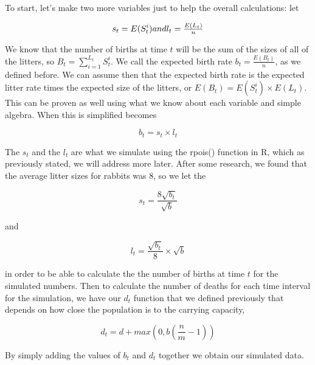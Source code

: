 \documentclass{article}\usepackage[]{graphicx}\usepackage[]{color}
\begin{document}
To start, let's make two more variables just to help the overall calculations: let 

\begin{equation}
s_t = E(S_t^i)$$ and $$l_t = \frac{E(L_t)}{n}
\end{equation}

We know that the number of births at time \(t\) will be the sum of the sizes of all of the litters, so \(B_t = \sum_{i=1}^{L_t} S_t^i\). We call the expected birth rate \(b_t = \frac{E(B_t)}{n}\), as we defined before. We can assume then that the expected birth rate is the expected litter rate times the expected size of the litters, or \(E(B_t) = E(S_t^i)\times E(L_t)\). This can be proven as well using what we know about each variable and simple algebra. When this is simplified becomes 

\begin{equation}
b_t = s_t\times l_t
\end{equation}

The \(s_t\) and the \(l_t\) are what we simulate using the rpois() function in R, which as previously stated, we will address more later. After some research, we found that the average litter sizes for rabbits was \(8\), so we let the 

\begin{equation}
s_t = \frac{8\sqrt{b_t}}{\sqrt{b}}
\end{equation}

and 

\begin{equation}
l_t = \frac{\sqrt{b_t}}{8}\times \sqrt{b}
\end{equation}

in order to be able to calculate the the number of births at time \(t\) for the simulated numbers. Then to calculate the number of deaths for each time interval for the simulation, we have our \(d_t\) function that we defined previously that depends on how close the population is to the carrying capacity, 

\begin{equation}
d_t = d + max(0, b(\frac{n}{m}-1))
\end{equation}

By simply adding the values of \(b_t\) and \(d_t\) together we obtain our simulated data.
\end{document}
